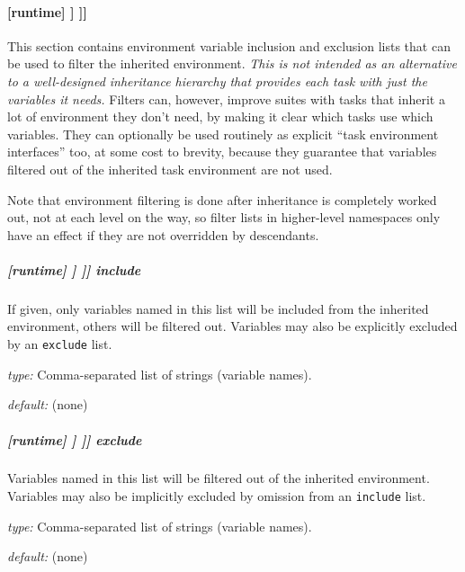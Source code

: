 \paragraph[{[[[}environment filter{]]]}]{ [runtime] \textrightarrow [[\_\_NAME\_\_]] \textrightarrow [[[environment filter]]]}
\label{EnvironmentFilter}

This section contains environment variable inclusion and exclusion
lists that can be used to filter the inherited environment. {\em This is
not intended as an alternative to a well-designed inheritance hierarchy
that provides each task with just the variables it needs.} Filters can,
however, improve suites with tasks that inherit a lot of environment
they don't need, by making it clear which tasks use which variables.
They can optionally be used routinely as explicit ``task environment
interfaces'' too, at some cost to brevity, because they guarantee that
variables filtered out of the inherited task environment are not used.

Note that environment filtering is done after inheritance is completely
worked out, not at each level on the way, so filter lists in higher-level
namespaces only have an effect if they are not overridden by descendants.

\subparagraph[include]{[runtime] \textrightarrow [[\_\_NAME\_\_]] \textrightarrow [[[environment filter]]] \textrightarrow include}

If given, only variables named in this list will be included from the
inherited environment, others will be filtered out. Variables may also
be explicitly excluded by an \lstinline=exclude= list.

\begin{myitemize}
\item {\em type:} Comma-separated list of strings (variable names).
\item {\em default:} (none)
\end{myitemize}

\subparagraph[exclude]{[runtime] \textrightarrow [[\_\_NAME\_\_]] \textrightarrow [[[environment filter]]] \textrightarrow exclude}

Variables named in this list will be filtered out of the inherited
environment.  Variables may also be implicitly excluded by
omission from an \lstinline=include= list.

\begin{myitemize}
\item {\em type:} Comma-separated list of strings (variable names).
\item {\em default:} (none)
\end{myitemize}

